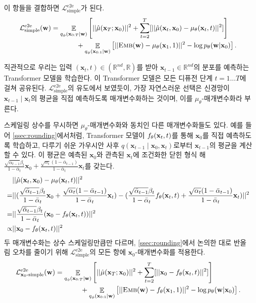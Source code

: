 \documentclass{article}
\newcommand{\exper}[1]{\textsc{#1}}
\newcommand{\expmb}[1]{\mathbf{#1}}
\newcommand{\alphabar}{\bar{\alpha}}
\newcommand{\ww}{\expmb{w}}
\newcommand{\cx}[1]{\mathbf{x}_{#1}}
\newcommand{\ptheta}{p_\theta}
\newcommand{\qphi}{q_\phi}
\newcommand{\Lsimpleee}{\mathcal{L}^\text{e2e}_\text{simple}}
\newcommand{\Emb}{\exper{Emb}}
\begin{document}
이 항들을 결합하면 $\Lsimpleee$가 된다.
\begin{align*}
    \mathcal{L}^\text{e2e}_\text{simple} (\ww) & =  \mathop{\mathbb{E}}_{\qphi(\cx{0:T} | \ww)}  \left[||\hat{\mu}(\cx{T}; \cx{0})||^2 + \sum_{t=2}^T [||\hat{\mu}(\cx{t}, \cx{0})-\mu_\theta(\cx{t}, t) ||^2] \right] \\
& ~~~~~~~~~~~ + \mathop{\mathbb{E}}_{\qphi(\cx{0:1} | \ww)} \left[|| \Emb(\ww) - \mu_\theta(\cx{1}, 1) ||^2  - \log \ptheta(\ww | \cx{0})\right].
\end{align*}

직관적으로 우리는 입력 $(\cx{t}, t) \in (\mathbb{R}^{nd}, \mathbb{R})$를 받아 $\cx{t-1} \in \mathbb{R}^{nd}$의 분포를 예측하는 Transformer 모델을 학습한다. 이 Transformer 모델은 모든 디퓨전 단계 $t = 1\dots T$에 걸쳐 공유된다. $\Lsimpleee$의 유도에서 보였듯이, 가장 자연스러운 선택은 신경망이 $\cx{t-1} \mid \cx{t}$의 평균을 직접 예측하도록 매개변수화하는 것이며, 이를 $\mu_\theta$-매개변수화라 부른다.

스케일링 상수를 무시하면 $\mu_\theta$-매개변수화와 동치인 다른 매개변수화들도 있다. 예를 들어 \cref{ssec:rounding}에서처럼, Transformer 모델이 $\xxtheta(\cx{t}, t)$를 통해 $\cx{0}$를 직접 예측하도록 학습하고, 다루기 쉬운 가우시안 사후 $q(\cx{t-1} \mid \cx{0}, \cx{t})$로부터 $\cx{t-1}$의 평균을 계산할 수 있다. 이 평균은 예측된 $\cx{0}$와 관측된 $\cx{t}$에 조건화한 닫힌 형식 해 $\frac{\sqrt{\alphabar_{t-1}} \beta_t}{1-\alphabar_t}\cx{0} + \frac{\sqrt{\alpha_t} (1-\alphabar_{t-1})}{1-\alphabar_t} \cx{t}$를 갖는다.
\begin{align*}
& ||\hat{\mu}(\cx{t}, \cx{0})-\mu_\theta(\cx{t}, t) ||^2 \\
= &  ||(\frac{\sqrt{\alphabar_{t-1}} \beta_t}{1-\alphabar_t}\cx{0} + \frac{\sqrt{\alpha_t} (1-\alphabar_{t-1})}{1-\alphabar_t} \cx{t}) - (\frac{\sqrt{\alphabar_{t-1}} \beta_t}{1-\alphabar_t}\xxtheta(\cx{t}, t) + \frac{\sqrt{\alpha_t} (1-\alphabar_{t-1})}{1-\alphabar_t} \cx{t})||^2\\
= & ||\frac{\sqrt{\alphabar_{t-1}} \beta_t}{1-\alphabar_t}(\cx{0} - \xxtheta(\cx{t}, t))||^2\\
\propto &  ||\cx{0} - \xxtheta(\cx{t}, t)||^2
\end{align*}
두 매개변수화는 상수 스케일링만큼만 다르며, \cref{ssec:rounding}에서 논의한 대로 반올림 오차를 줄이기 위해 $\Lsimpleee$의 모든 항에 $\cx{0}$-매개변수화를 적용한다.
\begin{align*}
    \mathcal{L}^\text{e2e}_{\cx{0}\text{-simple}} (\ww) & =  \mathop{\mathbb{E}}_{\qphi(\cx{0:T} | \ww)}  \left[||\hat{\mu}(\cx{T}; \cx{0})||^2 + \sum_{t=2}^T [||\cx{0}-\xxtheta(\cx{t}, t) ||^2] \right] \\
& ~~~~~~~~~~~ + \mathop{\mathbb{E}}_{\qphi(\cx{0:1} | \ww)} \left[|| \Emb(\ww) - \xxtheta(\cx{1}, 1) ||^2  - \log \ptheta(\ww | \cx{0})\right].
\end{align*}
\end{document}

